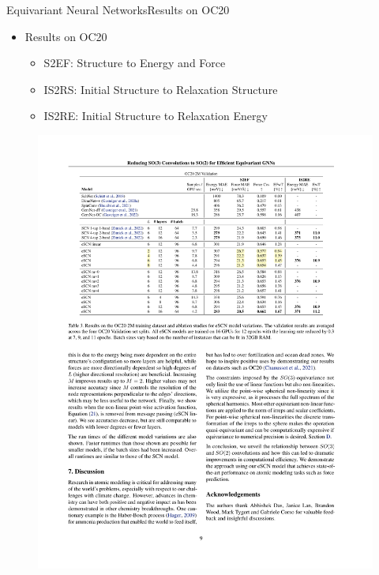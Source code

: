 \documentclass[pdf,serif]{beamer}
\begin{document}
\begin{frame}{Equivariant Neural Networks}{Results on OC20}
    \begin{itemize}
        \item Results on OC20 \citep{ocp_dataset}
        \begin{itemize}
            \item S2EF: Structure to Energy and Force
            \item IS2RS: Initial Structure to Relaxation Structure
            \item IS2RE: Initial Structure to Relaxation Energy
        \end{itemize}
    \end{itemize}
    \vspace*{1em}
    \begin{figure}
        \includegraphics[width=\linewidth]{images/resescn.pdf}
    \end{figure}
\end{frame}
\end{document}
